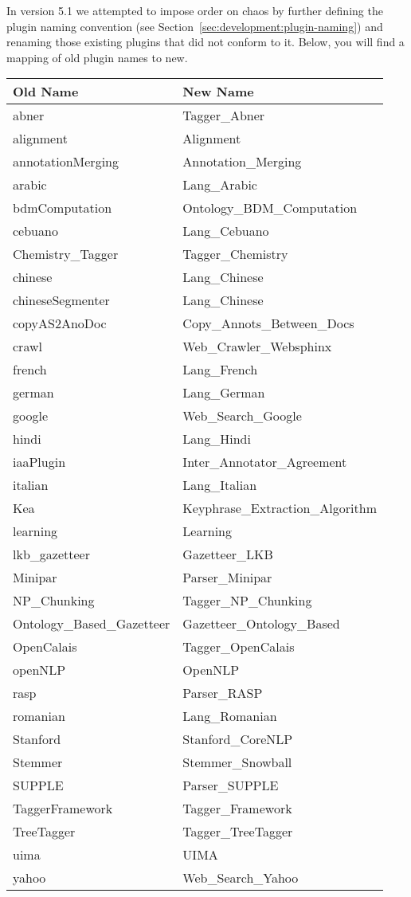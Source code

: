 

In version 5.1 we attempted to impose order on chaos by further defining the
plugin naming convention (see Section~\ref{sec:development:plugin-naming}) and
renaming those existing plugins that did not conform to it. Below, you will find
a mapping of old plugin names to new.

\begin{tabular}{|l|l|}
\hline
Old Name & New Name\\
\hline
abner & Tagger\_Abner\\
alignment & Alignment\\
annotationMerging & Annotation\_Merging\\
arabic & Lang\_Arabic\\
bdmComputation & Ontology\_BDM\_Computation\\
cebuano & Lang\_Cebuano\\
Chemistry\_Tagger & Tagger\_Chemistry\\
chinese & Lang\_Chinese\\
chineseSegmenter & Lang\_Chinese\\
copyAS2AnoDoc & Copy\_Annots\_Between\_Docs\\
crawl & Web\_Crawler\_Websphinx\\
french & Lang\_French\\
german & Lang\_German\\
google & Web\_Search\_Google\\
hindi & Lang\_Hindi\\
iaaPlugin & Inter\_Annotator\_Agreement\\
italian & Lang\_Italian\\
Kea & Keyphrase\_Extraction\_Algorithm\\
learning & Learning\\
lkb\_gazetteer & Gazetteer\_LKB\\
Minipar & Parser\_Minipar\\
NP\_Chunking & Tagger\_NP\_Chunking\\
Ontology\_Based\_Gazetteer & Gazetteer\_Ontology\_Based\\
OpenCalais & Tagger\_OpenCalais\\
openNLP & OpenNLP\\
rasp & Parser\_RASP\\
romanian & Lang\_Romanian\\
Stanford & Stanford\_CoreNLP\\
Stemmer & Stemmer\_Snowball\\
SUPPLE & Parser\_SUPPLE\\
TaggerFramework & Tagger\_Framework\\
TreeTagger & Tagger\_TreeTagger\\
uima & UIMA\\
yahoo & Web\_Search\_Yahoo\\
\hline
\end{tabular}



